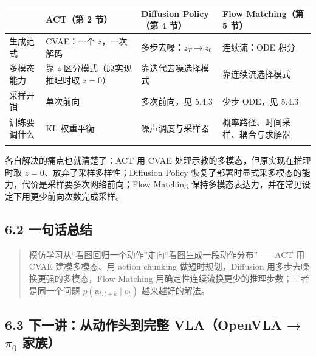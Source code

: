 \documentclass[
  chinese,
]{ctexart}
\begin{document}
\begin{center}
\begin{tabular}{@{}>{\raggedright\arraybackslash}p{} >{\raggedright\arraybackslash}p{} >{\raggedright\arraybackslash}p{} >{\raggedright\arraybackslash}p{}@{}}
\toprule\noalign{}
 & ACT（第 2 节） & Diffusion Policy（第 4 节） & Flow Matching（第 5 节） \\
\midrule\noalign{}
生成范式 & CVAE：一个 \(z\)，一次解码 & 多步去噪：\(z_T \to z_0\) & 连续流：ODE 积分 \\
多模态能力 & 靠 \(z\) 区分模式（原实现推理时取 \(z=0\)） & 靠迭代去噪选择模式 & 靠连续流选择模式 \\
采样开销 & 单次前向 & 多次前向，见 5.4.3 & 少步 ODE，见 5.4.3 \\
训练要调什么 & KL 权重平衡 & 噪声调度与采样器 & 概率路径、时间采样、耦合与求解器 \\
\bottomrule\noalign{}
\end{tabular}
\end{center}

各自解决的痛点也就清楚了：ACT 用 CVAE
处理示教的多模态，但原实现在推理时取
\(z=0\)、放弃了采样多样性；Diffusion Policy
恢复了部署时显式采多模态的能力，代价是采样要多次网络前向；Flow Matching
保持多模态表达力，并在常见设定下用更少前向次数完成采样。

\subsection{6.2 一句话总结}\label{ux4e00ux53e5ux8bddux603bux7ed3}

\begin{quote}
模仿学习从``看图回归一个动作''走向``看图生成一段动作分布''------ACT 用
CVAE 建模多模态、用 action chunking 做短时规划，Diffusion
用多步去噪换更强的多模态，Flow Matching
用确定性连续流换更少的推理步数；三者是同一个问题
\(p(\mathbf{a}_{t:t+k} \mid o_t)\) 越来越好的解法。
\end{quote}

\subsection{\texorpdfstring{6.3 下一讲：从动作头到完整 VLA（OpenVLA →
\(\pi_0\)
家族）}{6.3 下一讲：从动作头到完整 VLA（OpenVLA → \textbackslash pi\_0 家族）}}\label{ux4e0bux4e00ux8bb2ux4eceux52a8ux4f5cux5934ux5230ux5b8cux6574-vlaopenvla-pi_0-ux5bb6ux65cf}
\end{document}
